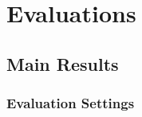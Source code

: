 


















































\section{Evaluations}
\subsection{Main Results}
\subsubsection{Evaluation Settings}
